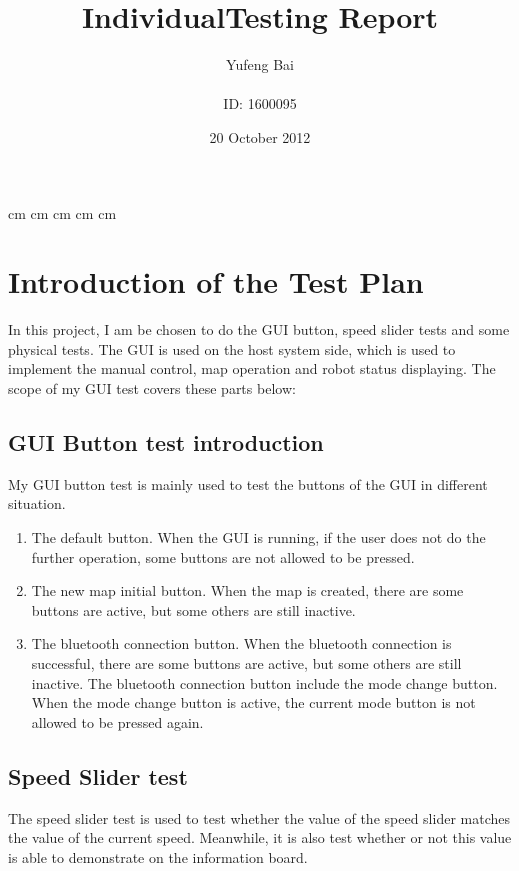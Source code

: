\documentclass[11pt, a4paper]{report}
\begin{document}
\title{\Huge IndividualTesting Report }
\author{Yufeng Bai\\ \\ID: 1600095}
\date{20 October 2012}
\maketitle
\pagebreak
{} cm
 cm
 cm
 cm
 cm
\tableofcontents

\chapter{Introduction of the Test Plan}
In this project, I am be chosen to do the GUI button, speed slider tests and some physical tests. The GUI is used on the host system side, which is used to implement the manual control, map operation and robot status displaying. The scope of my GUI test covers these parts below:
\section{GUI Button test introduction}
My GUI button test is mainly used to test the buttons of the GUI in different situation.
\begin{enumerate}
\item The default button. When the GUI is running, if the user does not do the further operation, some buttons are not allowed to be pressed.
\item The new map initial button. When the map is created, there are some buttons are active, but some others are still inactive. 
\item The bluetooth connection button. When the bluetooth connection is successful, there are some buttons are active, but some others are still inactive. The bluetooth connection button include the mode change button. When the mode change button is active, the current mode button is not allowed to be pressed again.    
\end{enumerate} 
\section{Speed Slider test}
The speed slider test is used to test whether the value of the speed slider matches the value of the current speed. Meanwhile, it is also test whether or not this value is able to demonstrate on the information board. 
\end{document}
